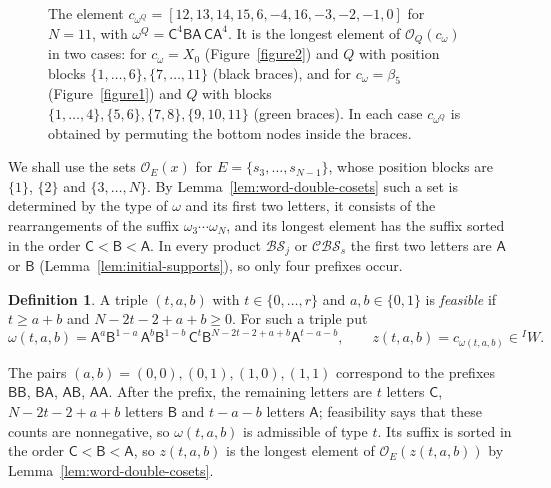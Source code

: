 \documentclass[11pt,a4paper,reqno]{amsart}
\numberwithin{equation}{section}
\theoremstyle{definition}
\newtheorem{definition}[theorem]{Definition}
\theoremstyle{remark}
\theoremstyle{plain}
\newcommand{\A}{\mathsf A}
\newcommand{\B}{\mathsf B}
\newcommand{\CC}{\mathsf C}
\newcommand{\R}{\mathcal {BS}}
\newcommand{\V}{\mathcal {CBS}}
\begin{document}
\begin{figure}[htbp]
 
  \vspace{-1.4cm}
  \caption{The element $c_{\omega^Q}=[12,13,14,15,6,-4,16,-3,-2,-1,0]$ for $N=11$, with $\omega^Q=\CC^4\B\A\,\CC\A^4$. It is the longest element of
  $\mathcal O_Q(c_\omega)$ in two cases: for $c_\omega=X_0$ (Figure~\ref{figure2}) and $Q$ with position blocks
  $\{1,\ldots,6\},\{7,\ldots,11\}$ (black braces), and for $c_\omega=\beta_5$ (Figure~\ref{figure1}) and $Q$ with blocks
  $\{1,\ldots,4\},\{5,6\},\{7,8\},\{9,10,11\}$ (green braces). In each case $c_{\omega^Q}$ is obtained by permuting the bottom nodes inside the braces.}
  \label{figure-omegaQ}
\end{figure}

\medskip
We shall use the sets $\mathcal O_E(x)$ for $E=\{s_3,\ldots,s_{N-1}\}$, whose position blocks are $\{1\}$, $\{2\}$ and
$\{3,\ldots,N\}$. By Lemma~\ref{lem:word-double-cosets} such a set is determined by the type of $\omega$ and its first two
letters, it consists of the rearrangements of the suffix $\omega_3\cdots\omega_N$, and its longest element has the suffix
sorted in the order $\CC<\B<\A$. In every product $\R_j$ or $\V_s$ the first two letters are $\A$ or $\B$
(Lemma~\ref{lem:initial-supports}), so only four prefixes occur.

\begin{definition}\label{def:final-maxima}
A triple $(t,a,b)$ with $t\in\{0,\ldots,r\}$ and $a,b\in\{0,1\}$ is \emph{feasible} if $t\geq a+b$ and
$N-2t-2+a+b\geq0$. For such a triple put
\[
 \omega(t,a,b)=\A^a\B^{1-a}\,\A^b\B^{1-b}\,\CC^t\B^{N-2t-2+a+b}\A^{t-a-b},
 \qquad z(t,a,b)=c_{\omega(t,a,b)}\in{}^IW .
\]
\end{definition}
The pairs $(a,b)=(0,0),(0,1),(1,0),(1,1)$ correspond to the prefixes $\B\B$, $\B\A$, $\A\B$, $\A\A$. After the prefix,
the remaining letters are $t$ letters $\CC$, $N-2t-2+a+b$ letters $\B$ and $t-a-b$ letters $\A$; feasibility says
that these counts are nonnegative, so $\omega(t,a,b)$ is admissible of type $t$. Its suffix is sorted in the order
$\CC<\B<\A$, so $z(t,a,b)$ is the longest element of $\mathcal O_E(z(t,a,b))$ by
Lemma~\ref{lem:word-double-cosets}.
\end{document}
